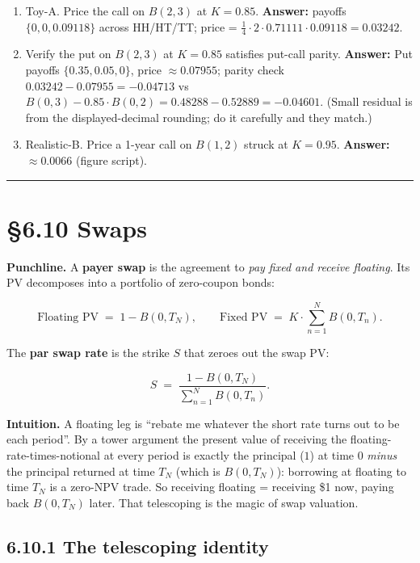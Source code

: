 \documentclass[
  10pt,
  twoside]{book}
\providecommand{\tightlist}{%
  \setlength{\itemsep}{0pt}\setlength{\parskip}{0pt}}
\begin{document}
\begin{enumerate}
\def\labelenumi{\arabic{enumi}.}
\tightlist
\item
  Toy-A. Price the call on \(B(2, 3)\) at \(K = 0.85\). \textbf{Answer:}
  payoffs \(\{0, 0, 0.09118\}\) across HH/HT/TT; price =
  \(\tfrac{1}{4} \cdot 2 \cdot 0.71111 \cdot 0.09118 = 0.03242\).
\item
  Verify the put on \(B(2, 3)\) at \(K = 0.85\) satisfies put-call
  parity. \textbf{Answer:} Put payoffs \(\{0.35, 0.05, 0\}\), price
  \(\approx 0.07955\); parity check \(0.03242 - 0.07955 = -0.04713\) vs
  \(B(0, 3) - 0.85 \cdot B(0, 2) = 0.48288 - 0.52889 = -0.04601\).
  (Small residual is from the displayed-decimal rounding; do it
  carefully and they match.)
\item
  Realistic-B. Price a 1-year call on \(B(1, 2)\) struck at
  \(K = 0.95\). \textbf{Answer:} \(\approx 0.0066\) (figure script).
\end{enumerate}

\begin{center}\rule{0.5\linewidth}{0.5pt}\end{center}

\section{§6.10 Swaps}\label{swaps}

\textbf{Punchline.} A \textbf{payer swap} is the agreement to \emph{pay
fixed and receive floating}. Its PV decomposes into a portfolio of
zero-coupon bonds:

\[\text{Floating PV} \;=\; 1 - B(0, T_N), \qquad \text{Fixed PV} \;=\; K \cdot \sum_{n=1}^{N} B(0, T_n).\]

The \textbf{par swap rate} is the strike \(S\) that zeroes out the swap
PV:

\[S \;=\; \frac{1 - B(0, T_N)}{\sum_{n=1}^{N} B(0, T_n)}.\]

\textbf{Intuition.} A floating leg is ``rebate me whatever the short
rate turns out to be each period''. By a tower argument the present
value of receiving the floating-rate-times-notional at every period is
exactly the principal (\(1\)) at time 0 \emph{minus} the principal
returned at time \(T_N\) (which is \(B(0, T_N)\)): borrowing at floating
to time \(T_N\) is a zero-NPV trade. So receiving floating = receiving
\$1 now, paying back \(B(0, T_N)\) later. That telescoping is the magic
of swap valuation.

\subsection{6.10.1 The telescoping
identity}\label{the-telescoping-identity}
\end{document}
